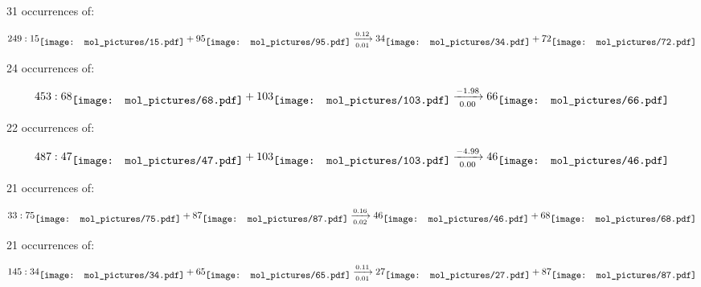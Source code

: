 \documentclass{article}
\begin{document}
\vspace{1cm}


31 occurrences of:

$$
249:  
15
\raisebox{-.5\height}{\texttt{[image: mol\_pictures/15.pdf]}}
+
95
\raisebox{-.5\height}{\texttt{[image: mol\_pictures/95.pdf]}}
\xrightarrow[0.01]{0.12}
34
\raisebox{-.5\height}{\texttt{[image: mol\_pictures/34.pdf]}}
+
72
\raisebox{-.5\height}{\texttt{[image: mol\_pictures/72.pdf]}}
$$



\vspace{1cm}


24 occurrences of:

$$
453:  
68
\raisebox{-.5\height}{\texttt{[image: mol\_pictures/68.pdf]}}
+
103
\raisebox{-.5\height}{\texttt{[image: mol\_pictures/103.pdf]}}
\xrightarrow[0.00]{-1.98}
66
\raisebox{-.5\height}{\texttt{[image: mol\_pictures/66.pdf]}}
$$



\vspace{1cm}


22 occurrences of:

$$
487:  
47
\raisebox{-.5\height}{\texttt{[image: mol\_pictures/47.pdf]}}
+
103
\raisebox{-.5\height}{\texttt{[image: mol\_pictures/103.pdf]}}
\xrightarrow[0.00]{-4.99}
46
\raisebox{-.5\height}{\texttt{[image: mol\_pictures/46.pdf]}}
$$



\vspace{1cm}


21 occurrences of:

$$
33:  
75
\raisebox{-.5\height}{\texttt{[image: mol\_pictures/75.pdf]}}
+
87
\raisebox{-.5\height}{\texttt{[image: mol\_pictures/87.pdf]}}
\xrightarrow[0.02]{0.16}
46
\raisebox{-.5\height}{\texttt{[image: mol\_pictures/46.pdf]}}
+
68
\raisebox{-.5\height}{\texttt{[image: mol\_pictures/68.pdf]}}
$$



\vspace{1cm}


21 occurrences of:

$$
145:  
34
\raisebox{-.5\height}{\texttt{[image: mol\_pictures/34.pdf]}}
+
65
\raisebox{-.5\height}{\texttt{[image: mol\_pictures/65.pdf]}}
\xrightarrow[0.01]{0.11}
27
\raisebox{-.5\height}{\texttt{[image: mol\_pictures/27.pdf]}}
+
87
\raisebox{-.5\height}{\texttt{[image: mol\_pictures/87.pdf]}}
$$
\end{document}
